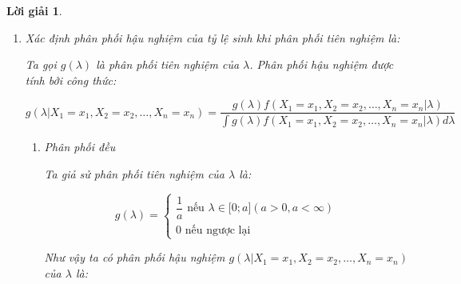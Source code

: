 \documentclass[14pt, a4paper]{article}
\theoremstyle{sltheorem}
\theoremstyle{soltheorem}
\newtheorem*{loigiai}{Lời giải}
\begin{document}
\begin{loigiai}
\begin{enumerate}
        \item Xác định phân phối hậu nghiệm của tỷ lệ sinh khi phân phối tiên nghiệm là:

        Ta gọi $g(\lambda)$ là phân phối tiên nghiệm của $\lambda$.
        Phân phối hậu nghiệm được tính bởi công thức:

        \begin{equation*}
            g(\lambda \vert X_1 =x_1, X_2=x_2, \dots, X_n=x_n) = \dfrac{g(\lambda) f(X_1=x_1,X_2=x_2,\dots, X_n=x_n \vert \lambda)}{\int g(\lambda) f(X_1=x_1,X_2=x_2,\dots, X_n=x_n \vert \lambda) d \lambda}
        \end{equation*}

        \begin{enumerate}[label=(\alph*)]
            \item Phân phối đều
            
            Ta giả sử phân phối tiên nghiệm của $\lambda$ là:

            \begin{equation*}
                g(\lambda) = \begin{cases}
                    \dfrac{1}{a} \text{ nếu } \lambda \in \lbrack 0; a\rbrack (a > 0, a < \infty) \\
                    0 \text{ nếu ngược lại}
                \end{cases}
            \end{equation*}

            Như vậy ta có phân phối hậu nghiệm $g(\lambda \vert X_1 =x_1, X_2=x_2, \dots, X_n=x_n)$ của $\lambda$ là:


\end{enumerate}
\end{enumerate}
\end{loigiai}
\end{document}
